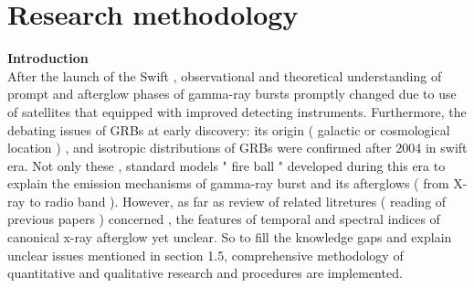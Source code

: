 \setcounter{chapter}{2}
\chapter{Research methodology}
\label{chap:3}
\textbf{Introduction}\\
After the launch of the Swift , observational and  theoretical understanding of  prompt and  afterglow  phases  of gamma-ray  bursts  promptly  changed  due to use of satellites that equipped  with  improved  detecting  instruments. Furthermore, the debating  issues of  GRBs at early  discovery: its origin ( galactic or  cosmological location ) , and isotropic  distributions  of GRBs  were  confirmed  after 2004 in swift era. Not only these , standard  models " fire ball  " developed  during this era to  explain  the  emission  mechanisms of gamma-ray burst and its  afterglows ( from X-ray to radio  band ). However,  as far as  review of related  litretures ( reading of  previous  papers ) concerned , the features  of  temporal and  spectral indices  of  canonical  x-ray  afterglow  yet  unclear. So to fill the  knowledge  gaps  and  explain  unclear  issues  mentioned  in section 1.5, comprehensive  methodology of  quantitative and  qualitative  research   and  procedures  are  implemented.   
